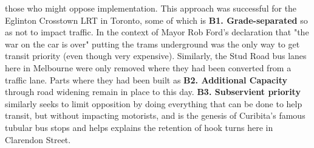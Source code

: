 \documentclass{tufte-handout}
\begin{document}
 those who might oppose  implementation.  This approach was successful for the Eglinton Crosstown LRT in Toronto, some of which is \textbf{B1. Grade-separated} so as not to impact traffic. In the context of Mayor Rob Ford's declaration that "the war on the car is over" putting the trams underground was the only way to get transit priority (even though very expensive). Similarly,  the Stud Road bus lanes here in Melbourne were only removed where they had been converted from a traffic lane. Parts where they had been built as \textbf{B2. Additional Capacity} through road widening remain in place to this day.  \textbf{B3. Subservient priority} similarly seeks to limit opposition  by doing everything that can be done to help transit, but without impacting motorists, and is the genesis of Curibita's famous tubular bus stops and helps explains the retention of hook turns here in Clarendon Street. 
\end{document}
